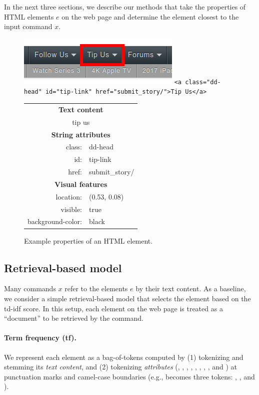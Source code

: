 In the next three sections,
we describe our methods that take the properties
of HTML elements $e$ on the web page and determine the element
closest to the input command $x$.

\begin{figure}
\centering
\includegraphics[scale=0.5]{figures/webrep/features.png}
\verb|<a class="dd-head" id="tip-link" href="submit_story/">Tip Us</a>|
\\[1em]
\begin{tabular}{rl}
\multicolumn{2}{c}{\textbf{Text content}} \\
\multicolumn{2}{c}{tip us} \\
\multicolumn{2}{c}{\textbf{String attributes}} \\
class: & dd-head \\
id: & tip-link \\
href: & submit\_story/ \\
\multicolumn{2}{c}{\textbf{Visual features}} \\
location: & (0.53, 0.08) \\
visible: & true\hphantom{owowhatsthis} \\
background-color: & black \\
\end{tabular}
\caption{Example properties of an HTML element.}
\label{fig:webrep-element-props}
\end{figure}

\subsection{Retrieval-based model}
Many commands $x$ refer to the elements $e$
by their text content.
As a baseline, we consider a simple retrieval-based model
that selects the element based on the td-idf score.
In this setup,
each element on the web page
is treated as a ``document''
to be retrieved by the command.

\paragraph{Term frequency (tf).}
We represent each element as a bag-of-tokens computed by
(1) tokenizing and stemming its \emph{text content},
and (2) tokenizing \emph{attributes}
(, , ,
, ,
, ,
, and )
at punctuation marks and camel-case boundaries
(e.g.,  becomes
three tokens: , , and ).

